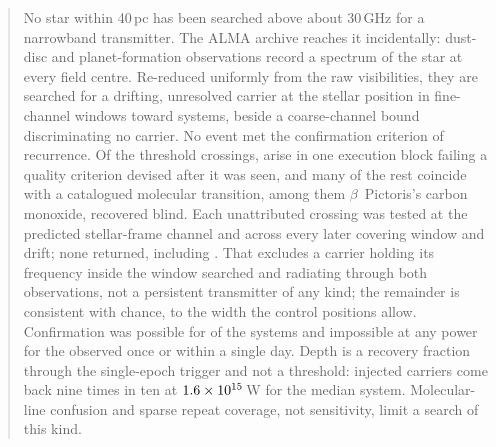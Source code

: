 \begin{abstract}
No star within 40\,pc has been searched above about 30\,GHz for a narrowband
transmitter. The ALMA archive reaches it incidentally: dust-disc and
planet-formation observations record a spectrum of the star at every field
centre. Re-reduced uniformly from the raw visibilities, they are searched for
a drifting, unresolved carrier at the stellar position in \NWinA{}
fine-channel windows toward \NSysClassA{} systems, beside a
coarse-channel bound discriminating no carrier. No event met the confirmation
criterion of recurrence. Of the \EvNCrossRaw{} threshold crossings,
\PrFlagXrossWord{} arise in one execution block failing a quality criterion
devised after it was seen, and many of the rest coincide with a catalogued
molecular transition, among them $\beta$~Pictoris's carbon monoxide,
recovered blind. Each unattributed crossing was tested at the predicted
stellar-frame channel and across every later covering window and drift; none
returned, including \PrRankClause. That excludes a carrier holding its
frequency inside the window searched and radiating through both observations,
not a persistent transmitter of any kind; the remainder is consistent with
chance, to the width the control positions allow. Confirmation was possible
for \ScSysIndep{} of the \NSysClassA{} systems and impossible at any power
for the \ScSysNoConf{} observed once or within a single day. Depth is a
recovery fraction through the single-epoch trigger and not a threshold:
injected carriers come back nine times in ten at $\EirpNinetySysMedA$\,W for
the median system. Molecular-line confusion and sparse repeat coverage, not
sensitivity, limit a search of this kind.
\end{abstract}


